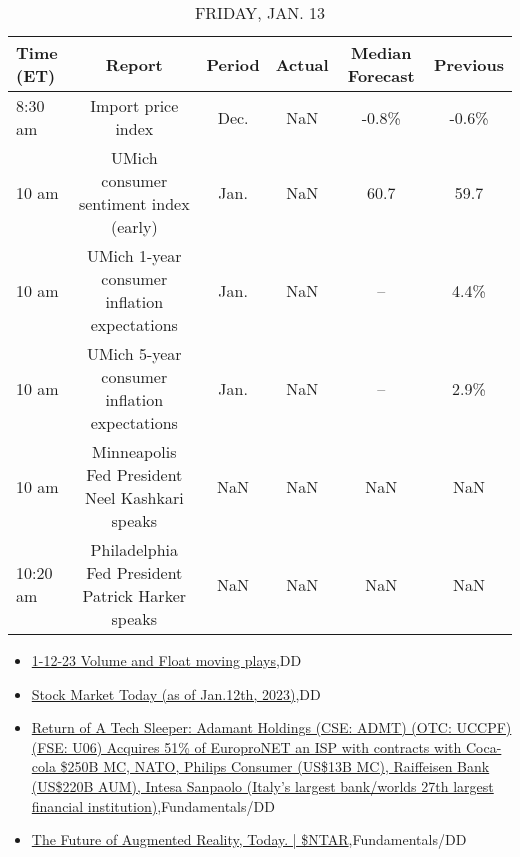 \documentclass{article}%
\begin{document}
%


\begin{table}[htbp]%
\caption{FRIDAY, JAN. 13}%
\centering%
\begin{adjustbox}{width=1\textwidth}%
\begin{tabular}{lccccc}
\toprule
Time (ET) &                                           Report & Period & Actual & Median Forecast & Previous \\
\midrule
  8:30 am &                               Import price index &   Dec. &    NaN &           -0.8\% &    -0.6\% \\
    10 am &           UMich consumer sentiment index (early) &   Jan. &    NaN &            60.7 &     59.7 \\
    10 am &     UMich 1-year consumer inflation expectations &   Jan. &    NaN &              -- &     4.4\% \\
    10 am &     UMich 5-year consumer inflation expectations &   Jan. &    NaN &              -- &     2.9\% \\
    10 am &   Minneapolis Fed President Neel Kashkari speaks &    NaN &    NaN &             NaN &      NaN \\
 10:20 am & Philadelphia Fed President Patrick Harker speaks &    NaN &    NaN &             NaN &      NaN \\
\bottomrule
\end{tabular}
%
\end{adjustbox}%
\end{table}

%
\begin{itemize}%
\item%
\href{https://reddit.com/r/wallstreetbets/comments/109ytzx/11223\_volume\_and\_float\_moving\_plays/}{1-12-23 Volume and Float moving plays},DD%
\item%
\href{https://reddit.com/r/wallstreetbets/comments/109y2sb/stock\_market\_today\_as\_of\_jan12th\_2023/}{Stock Market Today (as of Jan.12th, 2023)},DD%
\item%
\href{https://reddit.com/r/StockMarket/comments/109xmoq/return\_of\_a\_tech\_sleeper\_adamant\_holdings\_cse/}{Return of A Tech Sleeper: Adamant Holdings (CSE: ADMT) (OTC: UCCPF) (FSE: U06) Acquires 51\% of EuroproNET an ISP with contracts with Coca-cola \$250B MC, NATO, Philips Consumer (US\$13B MC), Raiffeisen Bank (US\$220B AUM), Intesa Sanpaolo (Italy's largest bank/worlds 27th largest financial institution)},Fundamentals/DD%
\item%
\href{https://reddit.com/r/StockMarket/comments/109vprd/the\_future\_of\_augmented\_reality\_today\_ntar/}{The Future of Augmented Reality, Today. | \$NTAR},Fundamentals/DD%
\end{itemize}%
\end{document}
